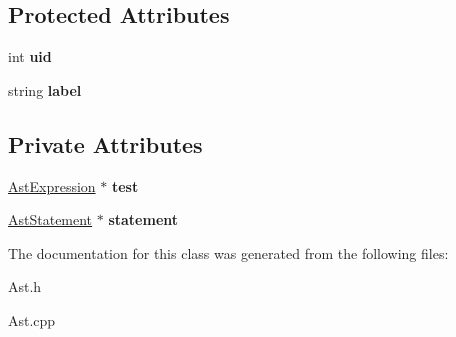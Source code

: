 \subsection*{Protected Attributes}
\begin{DoxyCompactItemize}
\item 
\hypertarget{classAST_a847b778f1c3dd5a19de32de432ee6e15}{int {\bfseries uid}}\label{classAST_a847b778f1c3dd5a19de32de432ee6e15}

\item 
\hypertarget{classAST_ab2e239ccc0688d2341724432ff5a1a31}{string {\bfseries label}}\label{classAST_ab2e239ccc0688d2341724432ff5a1a31}

\end{DoxyCompactItemize}
\subsection*{Private Attributes}
\begin{DoxyCompactItemize}
\item 
\hypertarget{classAstWhile_adbf8e12d5df4cbd2097341010f38886b}{\hyperlink{classAstExpression}{Ast\-Expression} $\ast$ {\bfseries test}}\label{classAstWhile_adbf8e12d5df4cbd2097341010f38886b}

\item 
\hypertarget{classAstWhile_a940a7e4a6f92b835c0405612946e7bda}{\hyperlink{classAstStatement}{Ast\-Statement} $\ast$ {\bfseries statement}}\label{classAstWhile_a940a7e4a6f92b835c0405612946e7bda}

\end{DoxyCompactItemize}


The documentation for this class was generated from the following files\-:\begin{DoxyCompactItemize}
\item 
Ast.\-h\item 
Ast.\-cpp\end{DoxyCompactItemize}
